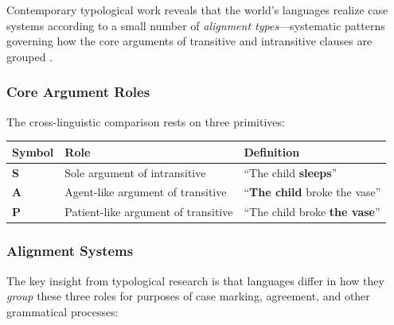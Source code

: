 \documentclass[
]{article}
\newcounter{none} %
\numberwithin{equation}{section}
\begin{document}
Contemporary typological work reveals that the world's languages realize
case systems according to a small number of \emph{alignment
types}---systematic patterns governing how the core arguments of
transitive and intransitive clauses are grouped
\citep{polinsky2015case, blake2001grammatical, haspelmath2009universality}.

\subsubsection{Core Argument Roles}\label{core-argument-roles}

The cross-linguistic comparison rests on three primitives:

{\def\LTcaptype{none} %
\begin{longtable}[]{@{}
  >{\centering\arraybackslash}p{}
  >{\raggedright\arraybackslash}p{}
  >{\raggedright\arraybackslash}p{}@{}}
\toprule\noalign{}
\begin{minipage}[b]{\linewidth}\centering
Symbol
\end{minipage} & \begin{minipage}[b]{\linewidth}\raggedright
Role
\end{minipage} & \begin{minipage}[b]{\linewidth}\raggedright
Definition
\end{minipage} \\
\midrule\noalign{}
\endhead
\bottomrule\noalign{}
\endlastfoot
\textbf{S} & Sole argument of intransitive & ``The child
\textbf{sleeps}'' \\
\textbf{A} & Agent-like argument of transitive & ``\textbf{The child}
broke the vase'' \\
\textbf{P} & Patient-like argument of transitive & ``The child broke
\textbf{the vase}'' \\
\end{longtable}
}

\subsubsection{Alignment Systems}\label{alignment-systems}

The key insight from typological research is that languages differ in
how they \emph{group} these three roles for purposes of case marking,
agreement, and other grammatical processes:
\end{document}
